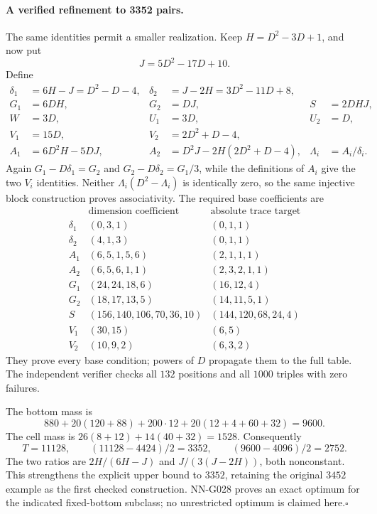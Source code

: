 \paragraph{A verified refinement to 3352 pairs.}
The same identities permit a smaller realization. Keep
$H=D^2-3D+1$, and now put
\[
 J=5D^2-17D+10.
\]
Define
\[
 \begin{aligned}
 \delta_1&=6H-J=D^2-D-4,&
 \delta_2&=J-2H=3D^2-11D+8,\\
 G_1&=6DH,&G_2&=DJ,&S&=2DHJ,\\
 W&=3D,&U_1&=3D,&U_2&=D,\\
 V_1&=15D,&V_2&=2D^2+D-4,\\
 A_1&=6D^2H-5DJ,&
 A_2&=D^2J-2H(2D^2+D-4),&\Lambda_i&=A_i/\delta_i.
 \end{aligned}                                                       \tag{G027.4}
\]
Again $G_1-D\delta_1=G_2$ and
$G_2-D\delta_2=G_1/3$, while the definitions of $A_i$
give the two $V_i$ identities. Neither
$\Lambda_i(D^2-\Lambda_i)$ is identically zero, so the
same injective block construction proves associativity.
The required base coefficients are
\[
\begin{array}{c|l|l}
 &\text{dimension coefficient}&\text{absolute trace target}\\\hline
 \delta_1&(0,3,1)&(0,1,1)\\
 \delta_2&(4,1,3)&(0,1,1)\\
 A_1&(6,5,1,5,6)&(2,1,1,1)\\
 A_2&(6,5,6,1,1)&(2,3,2,1,1)\\
 G_1&(24,24,18,6)&(16,12,4)\\
 G_2&(18,17,13,5)&(14,11,5,1)\\
 S&(156,140,106,70,36,10)&(144,120,68,24,4)\\
 V_1&(30,15)&(6,5)\\
 V_2&(10,9,2)&(6,3,2)
\end{array}                                                         \tag{G027.5}
\]
They prove every base condition; powers of $D$ propagate
them to the full table. The independent verifier
 checks all $132$
positions and all $1000$ triples with zero failures.

The bottom mass is
\[
 880+20(120+88)+200\cdot12+20(12+4+60+32)=9600.
\]
The cell mass is $26(8+12)+14(40+32)=1528$.
Consequently
\[
 T=11128,\qquad
 (11128-4424)/2=3352,\qquad(9600-4096)/2=2752.
 \tag{G027.6}
\]
The two ratios are $2H/(6H-J)$ and
$J/(3(J-2H))$, both nonconstant. This strengthens the
explicit upper bound to $3352$, retaining the original
$3452$ example as the first checked construction.
NN-G028 proves an exact optimum for the indicated
fixed-bottom subclass; no unrestricted optimum is
claimed here.\hfill$\square$

